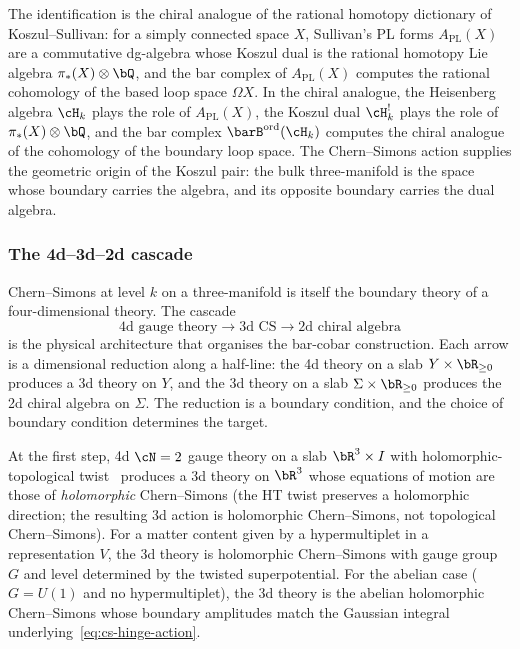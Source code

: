 \begin{remark}
\label{rem:cs-hinge-koszul-sullivan}
The identification is the chiral analogue of the rational homotopy
dictionary of Koszul--Sullivan: for a simply connected space $X$,
Sullivan's PL forms $A_{\mathrm{PL}}(X)$ are a commutative
dg-algebra whose Koszul dual is the rational homotopy Lie
algebra $\pi_*(X) \otimes \bQ$, and the bar complex of
$A_{\mathrm{PL}}(X)$ computes the rational cohomology of the
based loop space $\Omega X$. In the chiral analogue, the
Heisenberg algebra $\cH_k$ plays the role of
$A_{\mathrm{PL}}(X)$, the Koszul dual $\cH_k^!$ plays the role of
$\pi_*(X) \otimes \bQ$, and the bar complex
$\barB^{\mathrm{ord}}(\cH_k)$ computes the chiral analogue of
the cohomology of the boundary loop space. The Chern--Simons
action supplies the geometric origin of the Koszul pair: the
bulk three-manifold is the space whose boundary carries the
algebra, and its opposite boundary carries the dual algebra.
\end{remark}

\subsubsection{The 4d--3d--2d cascade}
\label{sec:cs-hinge-cascade}

Chern--Simons at level $k$ on a three-manifold is itself the
boundary theory of a four-dimensional theory. The cascade
\[
\text{4d gauge theory}
\longrightarrow
\text{3d CS}
\longrightarrow
\text{2d chiral algebra}
\]
is the physical architecture that organises the bar-cobar
construction. Each arrow is a dimensional reduction along a
half-line: the 4d theory on a slab $Y \times \bR_{\ge 0}$
produces a 3d theory on $Y$, and the 3d theory on a slab
$\Sigma \times \bR_{\ge 0}$ produces the 2d chiral algebra on
$\Sigma$. The reduction is a boundary condition, and the choice
of boundary condition determines the target.

At the first step, 4d $\cN = 2$ gauge theory on a slab
$\bR^3 \times I$ with holomorphic-topological
twist~\cite{costello-renormalization}
produces a 3d theory on $\bR^3$ whose equations of motion are
those of \emph{holomorphic} Chern--Simons (the HT twist preserves
a holomorphic direction; the resulting 3d action is holomorphic
Chern--Simons, not topological Chern--Simons).
For a matter content given
by a hypermultiplet in a representation $V$, the 3d theory is
holomorphic Chern--Simons with gauge group $G$ and level determined
by the twisted superpotential. For the abelian case ($G = U(1)$ and
no hypermultiplet), the 3d theory is the abelian holomorphic
Chern--Simons whose boundary amplitudes match the Gaussian integral
underlying~\eqref{eq:cs-hinge-action}.

